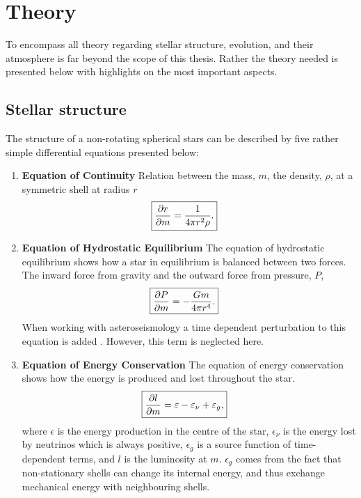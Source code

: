 \chapter{Theory}

To encompass all theory regarding stellar structure, evolution, and their
atmosphere is far beyond the scope of this thesis. Rather the theory needed is
presented below with highlights on the most important aspects.


\section{Stellar structure}

The structure of a non-rotating spherical stars can be described by five rather
simple differential equations \citep[see e.g.][]{kippenhahn} presented below:
\begin{enumerate}
    \item \textbf{Equation of Continuity}
        \nicebreak
        Relation between the mass, $m$, the density, $\rho$, at a symmetric
        shell at radius $r$
        \begin{align}
            \Aboxed{\pd{r}{m} &= \frac{1}{4\pi r^2\rho}.}
        \end{align}

    \item \textbf{Equation of Hydrostatic Equilibrium}
        \nicebreak
        The equation of hydrostatic equilibrium shows how a star in equilibrium
        is balanced between two forces. The inward force from gravity and the
        outward force from pressure, $P$,
        \begin{align}
            \Aboxed{\pd{P}{m} &= -\frac{Gm}{4\pi r^4}.}
        \end{align}
        When working with asteroseismology a time dependent perturbation to this
        equation is added \citep[see e.g.][for a thorough discussion]{Aerts2010}.
        However, this term is neglected here.


    \item \textbf{Equation of Energy Conservation}
        \nicebreak
        The equation of energy conservation shows how the energy is produced and
        lost throughout the star.
        \begin{align}
            \Aboxed{\pd{l}{m} = \epsilon - \epsilon_\nu + \epsilon_g,}
        \end{align}
        where $\epsilon$ is the energy production in the centre of the star,
        $\epsilon_\nu$ is the energy lost by neutrinos which is always
        positive, $\epsilon_g$ is a source function of time-dependent terms,
        and $l$ is the luminosity at $m$. $\epsilon_g$ comes from the fact that
        non-stationary shells can change its internal energy, and thus exchange
        mechanical energy with neighbouring shells.


\end{enumerate}
